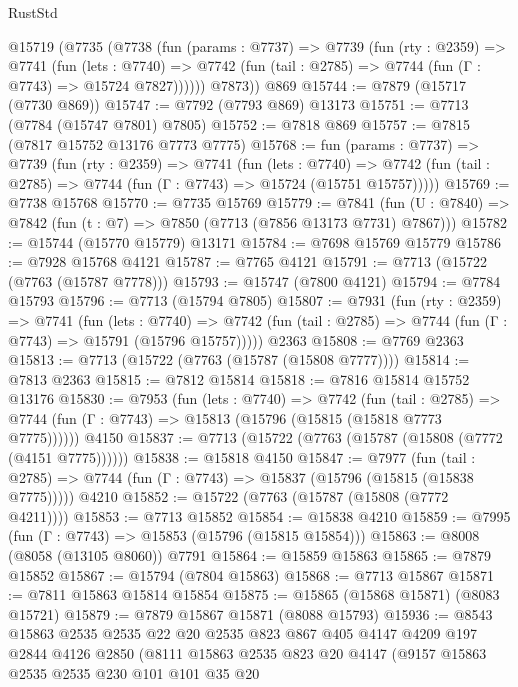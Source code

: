 \begin{lexlean}{RustStd}
\begin{coremodule}
    @15719
      (@7735
        (@7738
          (fun (params : @7737) =>
          @7739
            (fun (rty : @2359) =>
            @7741
              (fun (lets : @7740) =>
              @7742 (fun (tail : @2785) => @7744 (fun (Γ : @7743) => @15724 @7827))))))
        @7873))
    @869
@15744 := @7879 (@15717 (@7730 @869))
@15747 := @7792 (@7793 @869) @13173
@15751 := @7713 (@7784 (@15747 @7801) @7805)
@15752 := @7818 @869
@15757 := @7815 (@7817 @15752 @13176 @7773 @7775)
@15768 := fun (params : @7737) =>
  @7739
    (fun (rty : @2359) =>
    @7741
      (fun (lets : @7740) =>
      @7742 (fun (tail : @2785) => @7744 (fun (Γ : @7743) => @15724 (@15751 @15757)))))
@15769 := @7738 @15768
@15770 := @7735 @15769
@15779 := @7841
    (fun (U : @7840) => @7842 (fun (t : @7) => @7850 (@7713 (@7856 @13173 @7731) @7867)))
@15782 := @15744 (@15770 @15779) @13171
@15784 := @7698 @15769 @15779
@15786 := @7928 @15768 @4121
@15787 := @7765 @4121
@15791 := @7713 (@15722 (@7763 (@15787 @7778)))
@15793 := @15747 (@7800 @4121)
@15794 := @7784 @15793
@15796 := @7713 (@15794 @7805)
@15807 := @7931
    (fun (rty : @2359) =>
    @7741
      (fun (lets : @7740) =>
      @7742 (fun (tail : @2785) => @7744 (fun (Γ : @7743) => @15791 (@15796 @15757)))))
    @2363
@15808 := @7769 @2363
@15813 := @7713 (@15722 (@7763 (@15787 (@15808 @7777))))
@15814 := @7813 @2363
@15815 := @7812 @15814
@15818 := @7816 @15814 @15752 @13176
@15830 := @7953
    (fun (lets : @7740) =>
    @7742
      (fun (tail : @2785) =>
      @7744 (fun (Γ : @7743) => @15813 (@15796 (@15815 (@15818 @7773 @7775))))))
    @4150
@15837 := @7713 (@15722 (@7763 (@15787 (@15808 (@7772 (@4151 @7775))))))
@15838 := @15818 @4150
@15847 := @7977
    (fun (tail : @2785) => @7744 (fun (Γ : @7743) => @15837 (@15796 (@15815 (@15838 @7775)))))
    @4210
@15852 := @15722 (@7763 (@15787 (@15808 (@7772 @4211))))
@15853 := @7713 @15852
@15854 := @15838 @4210
@15859 := @7995 (fun (Γ : @7743) => @15853 (@15796 (@15815 @15854)))
@15863 := @8008 (@8058 (@13105 @8060)) @7791
@15864 := @15859 @15863
@15865 := @7879 @15852
@15867 := @15794 (@7804 @15863)
@15868 := @7713 @15867
@15871 := @7811 @15863 @15814 @15854
@15875 := @15865 (@15868 @15871) (@8083 @15721)
@15879 := @7879 @15867 @15871 (@8088 @15793)
@15936 := @8543
    @15863
    @2535
    @2535
    @22
    @20
    @2535
    @823
    @867
    @405
    @4147
    @4209
    @197
    @2844
    @4126
    @2850
    (@8111
      @15863
      @2535
      @823
      @20
      @4147
      (@9157
        @15863
        @2535
        @2535
        @230
        @101
        @101
        @35
        @20

\end{coremodule}
\end{lexlean}
